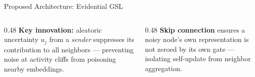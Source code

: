 \documentclass[aspectratio=169]{beamer}
\begin{document}
\begin{frame}{Proposed Architecture: Evidential GSL}
\begin{center}
\end{center}
\vspace{2pt}
\begin{columns}[T]
\begin{column}{0.48\textwidth}
{\small \textbf{Key innovation:} aleatoric uncertainty $u_j$ from a
\emph{sender} suppresses its contribution to all neighbors ---
preventing noise at activity cliffs from poisoning nearby embeddings.}
\end{column}
\begin{column}{0.48\textwidth}
{\small \textbf{Skip connection} ensures a noisy node's own
representation is not zeroed by its own gate ---
isolating self-update from neighbor aggregation.}
\end{column}
\end{columns}
\end{frame}
\end{document}
